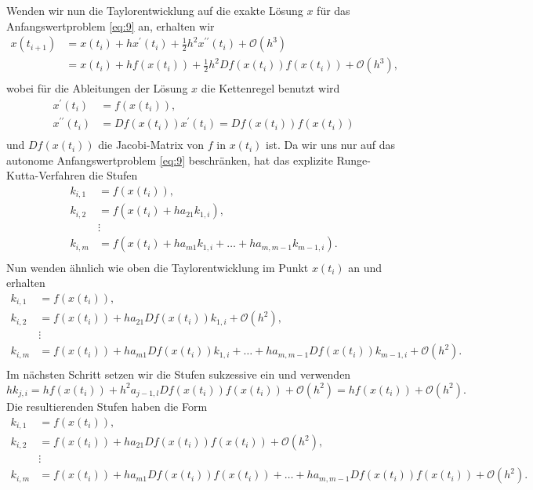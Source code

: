 Wenden wir nun die Taylorentwicklung auf die exakte Lösung $x$ für das Anfangswertproblem \eqref{eq:9} an, erhalten wir
\begin{align*}
    x(t_{i+1}) &= x(t_i) + hx^{\prime}(t_i) + \frac{1}{2} h^2 x^{\prime \prime}(t_i) + \mathcal{O}(h^3) \\
    &= x(t_i) + hf(x(t_i)) + \frac{1}{2} h^2 Df(x(t_i)) f(x(t_i)) + \mathcal{O}(h^3),\\
\end{align*}
wobei für die Ableitungen der Lösung $x$ die Kettenregel benutzt wird
\begin{align*}
    x^{\prime}(t_i) &= f(x(t_i)),\\
    x^{\prime \prime}(t_i) &= Df(x(t_i))x^{\prime}(t_i) = Df(x(t_i))f(x(t_i))\\
\end{align*}
und $Df(x(t_i))$ die Jacobi-Matrix von $f$ in $x(t_i)$ ist. Da wir uns nur auf das autonome Anfangswertproblem
\eqref{eq:9} beschränken, hat das explizite Runge-Kutta-Verfahren die Stufen
\begin{align*}
    k_{i,1} &= f(x(t_i)), \\
    k_{i,2} &= f(x(t_i) + ha_{21}k_{1,i}), \\
    &\vdots\\
    k_{i,m} &= f(x(t_i) + ha_{m1}k_{1,i} + \dots + ha_{m,m-1}k_{m-1,i}).\\
\end{align*}
Nun wenden ähnlich wie oben die Taylorentwicklung im Punkt $x(t_i)$ an und erhalten
\begin{align*}
    k_{i,1} &= f(x(t_i)), \\
    k_{i,2} &= f(x(t_i)) + ha_{21}Df(x(t_i))k_{1,i} + \mathcal{O}(h^2), \\
    &\vdots\\
    k_{i,m} &= f(x(t_i)) + ha_{m1}Df(x(t_i))k_{1,i} + \dots + ha_{m,m-1}Df(x(t_i))k_{m-1,i} + \mathcal{O}(h^2). \\
\end{align*}
Im nächsten Schritt setzen wir die Stufen sukzessive ein und verwenden
\[
    h k_{j,i} = hf(x(t_i)) + h^2 a_{j-1,l}Df(x(t_i))f(x(t_i)) + \mathcal{O}(h^2) = hf(x(t_i)) + \mathcal{O}(h^2).
\]
Die resultierenden Stufen haben die Form
\begin{align*}
    k_{i,1} &= f(x(t_i)), \\
    k_{i,2} &= f(x(t_i)) + ha_{21}Df(x(t_i))f(x(t_i)) + \mathcal{O}(h^2), \\
    &\vdots\\
    k_{i,m} &= f(x(t_i)) + ha_{m1}Df(x(t_i))f(x(t_i)) + \dots + ha_{m,m-1}Df(x(t_i))f(x(t_i)) + \mathcal{O}(h^2). \\
\end{align*}
